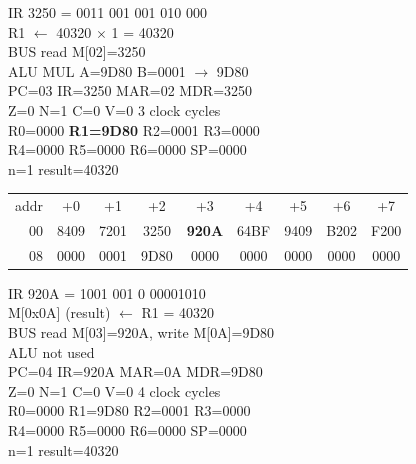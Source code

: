 \noindent\begin{tcolorbox}[stepbox, title={Step 38 \hfill PC 02 \quad MUL R1, R1, R2}]
\textcolor{dim}{IR} 3250 = 0011 001 001 010 000\\
R1 $\leftarrow$ 40320 $\times$ 1 = 40320\\
\textcolor{dim}{BUS} read M[02]=3250\\
\textcolor{dim}{ALU} MUL A=9D80 B=0001 $\rightarrow$ 9D80\\
PC=03 IR=3250 MAR=02 MDR=3250\\
Z=0 N=1 C=0 V=0 \hfill \textcolor{dim}{3 clock cycles}\\
R0=0000 \textcolor{wrt}{\textbf{R1=9D80}} R2=0001 R3=0000\\
R4=0000 R5=0000 R6=0000 SP=0000\\
\textcolor{dim}{n=1  result=40320}\\[1pt]
{\setlength{\tabcolsep}{1.6pt}\begin{tabular}{@{}r*{8}{c}@{}}
\textcolor{dim}{addr} & \textcolor{dim}{+0} & \textcolor{dim}{+1} & \textcolor{dim}{+2} & \textcolor{dim}{+3} & \textcolor{dim}{+4} & \textcolor{dim}{+5} & \textcolor{dim}{+6} & \textcolor{dim}{+7}\\
\textcolor{dim}{00} & 8409 & 7201 & 3250 & \cellcolor{pcc}\textbf{920A} & 64BF & 9409 & B202 & F200\\
\textcolor{dim}{08} & 0000 & \cellcolor{datac}0001 & \cellcolor{datac}9D80 & 0000 & 0000 & 0000 & 0000 & 0000\\
\end{tabular}}
\end{tcolorbox}\hfill\begin{tcolorbox}[stepbox, title={Step 39 \hfill PC 03 \quad ST R1, result}]
\textcolor{dim}{IR} 920A = 1001 001 0 00001010\\
M[0x0A] (result) $\leftarrow$ R1 = 40320\\
\textcolor{dim}{BUS} read M[03]=920A, \textcolor{wrt}{write M[0A]=9D80}\\
\textcolor{dim}{ALU} \textcolor{dim}{not used}\\
PC=04 IR=920A MAR=0A MDR=9D80\\
Z=0 N=1 C=0 V=0 \hfill \textcolor{dim}{4 clock cycles}\\
R0=0000 R1=9D80 R2=0001 R3=0000\\
R4=0000 R5=0000 R6=0000 SP=0000\\
\textcolor{dim}{n=1  result=40320}\\[1pt]
{\setlength{\tabcolsep}{1.6pt}\begin{tabular}{@{}r*{8}{c}@{}}

\end{tabular}}
\end{tcolorbox}
